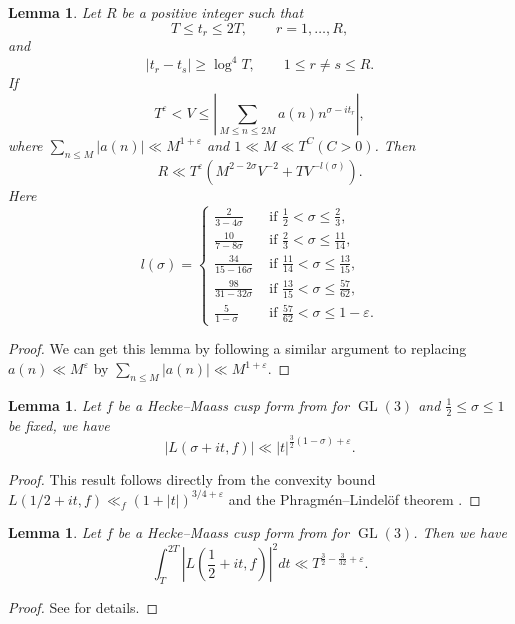 \documentclass[10pt,leqno]{amsart}
\numberwithin{equation}{section}
\newtheorem{lemma}[definition]{{Lemma}}
\begin{document}
\begin{lemma}\label{le4.13}
   Let $R$ be  a positive integer  such that
    \[
    T \leqslant t_r \leqslant 2T, \qquad r=1,\dots,R,
    \]
    and
    \[
    |t_r - t_s| \geqslant \log^{4} T, \qquad 1 \leqslant r \neq s \leqslant R.
    \]
     If
    \[
    T^\varepsilon<V \leqslant\left|\sum_{M \leqslant n \leqslant 2 M} a(n) n^{\sigma-i t_r}\right|,
    \]
    where $\sum_{n\leqslant M}|a(n)| \ll M^{1+\varepsilon}$ and $1 \ll M \ll T^C(C>0)$. Then
    \begin{equation}\label{eq4.43}
        R \ll T^\varepsilon\left(M^{2-2 \sigma} V^{-2}+T V^{-l(\sigma)}\right) .
    \end{equation}
    Here
    \[
    l(\sigma)= \begin{cases}\frac{2}{3-4 \sigma} & \text { if } \frac{1}{2}<\sigma \leq \frac{2}{3}, \\ \frac{10}{7-8 \sigma} & \text { if } \frac{2}{3}<\sigma \leqslant \frac{11}{14}, \\ \frac{34}{15-16 \sigma} & \text { if } \frac{11}{14}<\sigma \leqslant \frac{13}{15}, \\ \frac{98}{31-32 \sigma} & \text { if } \frac{13}{15}<\sigma \leqslant \frac{57}{62}, \\ \frac{5}{1-\sigma} & \text { if } \frac{57}{62}<\sigma \leqslant 1-\varepsilon .\end{cases}
    \]
\end{lemma}

\begin{proof}
    We can get this lemma by following a similar argument to \cite[Lemma 8.2]{MR792089} replacing $a(n)\ll M^\varepsilon$ by $\sum_{n\leqslant M}|a(n)|\ll M^{1+\varepsilon}$.
\end{proof}
\begin{lemma}\label{le4.14}
     Let $f$ be a Hecke--Maass cusp form from for $\operatorname{GL}(3)$ and $\frac{1}{2}\leqslant \sigma \leqslant 1$ be fixed, we have
    \[
    \left|L(\sigma+it ,f)\right|\ll \left|t\right|^{\frac{3}{2}(1-\sigma)+\varepsilon}.
    \]
\end{lemma}
\begin{proof}
    This result follows directly from the convexity bound $L(1/2+it ,f)\ll _f (1+\left|t\right|)^{3/4+\varepsilon}$ and the  Phragm\'en--Lindel\"of theorem \cite[Theorem 8.2.1]{MR2254662}.
\end{proof}
\begin{lemma}\label{le4.15}
     Let $f$ be a Hecke--Maass cusp form from for $\operatorname{GL}(3)$. Then we have
    \[
    \int_{T}^{2T}\left|L(\frac{1}{2}+it,f)\right|^2 dt\ll  T^{\frac{3}{2}-\frac{3}{32}+\varepsilon}.
    \]
\end{lemma}
\begin{proof}
    See \cite[Theorem 1.0.1]{MR4945119} for details.
\end{proof}
\end{document}
